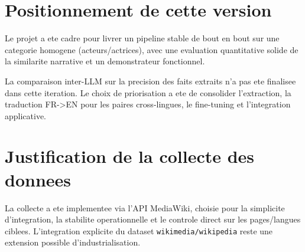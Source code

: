 \section{Positionnement de cette version}
Le projet a ete cadre pour livrer un pipeline stable de bout en bout sur une categorie
homogene (acteurs/actrices), avec une evaluation quantitative solide de la similarite
narrative et un demonstrateur fonctionnel.

La comparaison inter-LLM sur la precision des faits extraits n'a pas ete finalisee dans
cette iteration. Le choix de priorisation a ete de consolider l'extraction,
la traduction FR->EN pour les paires cross-lingues, le fine-tuning et l'integration applicative.

\section{Justification de la collecte des donnees}
La collecte a ete implementee via l'API MediaWiki, choisie pour la simplicite d'integration,
la stabilite operationnelle et le controle direct sur les pages/langues ciblees.
L'integration explicite du dataset \texttt{wikimedia/wikipedia} reste une extension
possible d'industrialisation.
